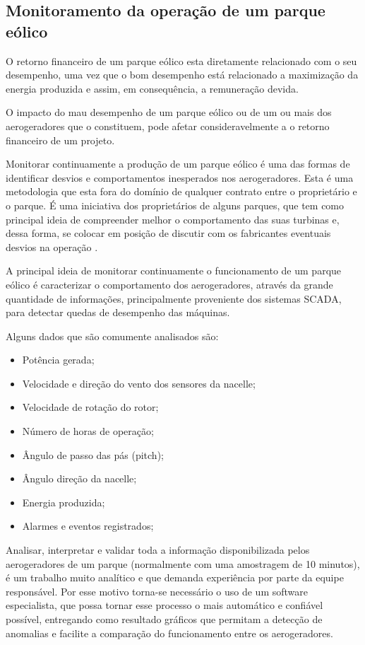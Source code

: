 \subsection{Monitoramento da operação de um parque eólico }
\label{Sec:monitoramentoDeUmParqueEolico}

O retorno financeiro de um parque eólico esta diretamente relacionado com o seu desempenho, uma vez que o bom desempenho está relacionado a maximização da energia produzida e assim, em consequência, a remuneração devida.

O impacto do mau desempenho de um parque eólico ou de um ou mais dos aerogeradores que o constituem, pode afetar consideravelmente a o retorno financeiro de um projeto.

Monitorar continuamente a produção de um parque eólico é uma das formas de identificar desvios e comportamentos inesperados nos aerogeradores. Esta é uma metodologia que esta fora do domínio de qualquer contrato entre o proprietário e o parque. É uma iniciativa dos proprietários de alguns parques, que tem como principal ideia de compreender melhor o comportamento das suas turbinas e, dessa forma, se colocar em posição de discutir com os fabricantes eventuais desvios na operação \cite{metodologia-avaliacao-desempenho-de-parques}.

A principal ideia de monitorar continuamente o funcionamento de um parque eólico é caracterizar o comportamento dos aerogeradores, através da grande quantidade de informações, principalmente proveniente dos sistemas SCADA, para detectar quedas de desempenho das máquinas.

Alguns dados que são comumente analisados são:
\begin{itemize}
    \item Potência gerada;
    \item Velocidade e direção do vento dos sensores da nacelle;
    \item Velocidade de rotação do rotor;
    \item Número de horas de operação;
    \item Ângulo de passo das pás (pitch);
    \item Ângulo direção da nacelle;
    \item Energia produzida;
    \item Alarmes e eventos registrados;
\end{itemize}

Analisar, interpretar e validar toda a informação disponibilizada pelos aerogeradores de um parque (normalmente com uma amostragem de 10 minutos), é um trabalho muito analítico e que demanda experiência por parte da equipe responsável. Por esse motivo torna-se necessário o uso de um software especialista, que possa tornar esse processo o mais automático e confiável possível, entregando como resultado gráficos que permitam a detecção de anomalias e facilite a comparação do funcionamento entre os aerogeradores.


